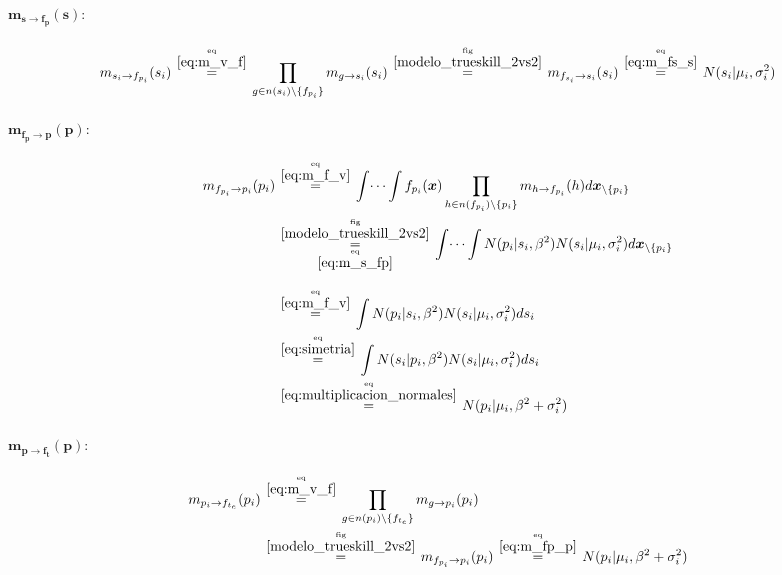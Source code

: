 \documentclass[article]{jss}
\newcommand\hfrac[2]{\genfrac{}{}{0pt}{}{#1}{#2}} %
\begin{document}
\begin{appendix}
\paragraph{$\bm{m_{s \rightarrow f_p}(s)}:$}

\begin{equation}\label{eq:m_s_fp}
 m_{s_i \rightarrow f_{p_i}}(s_i) \overset{\hfrac{\text{eq}}{\ref{eq:m_v_f}}}{=} \prod_{g \in n(s_i) \setminus  \{f_{p_i} \}} m_{g \rightarrow s_i} (s_i) \overset{\hfrac{\text{fig}}{\ref{modelo_trueskill_2vs2}}}{=} m_{f_{s_i} \rightarrow s_i}(s_i) \overset{\hfrac{\text{eq}}{\ref{eq:m_fs_s}}}{=}   N(s_i| \mu_i, \sigma_i^2)
\end{equation}



\paragraph{$\bm{m_{f_p \rightarrow p}(p)}:$}

\begin{equation}\label{eq:m_fp_p}
\begin{split}
 m_{f_{p_i} \rightarrow p_i}(p_i) & \overset{\hfrac{\text{eq}}{\ref{eq:m_f_v}}}{=} \int \dots \int f_{p_i}(\bm{x}) \prod_{h \in n(f_{p_i}) \setminus \{p_i\} } m_{h \rightarrow f_{p_i}}(h) d\bm{x}_{\setminus \{p_i\} }  \\
 & \overset{\hfrac{\text{fig}}{\ref{modelo_trueskill_2vs2}}}{\underset{\hfrac{\text{eq}}{\ref{eq:m_s_fp}}}{=}} \int \dots \int N(p_i| s_i, \beta^2) N(s_i| \mu_i, \sigma_i^2) d\bm{x}_{\setminus \{p_i\} } \\[0.3cm]
 & \overset{\hfrac{\text{eq}}{\ref{eq:m_f_v}}}{=} \int N(p_i| s_i, \beta^2) N(s_i| \mu_i, \sigma_i^2) ds_i \\
 & \overset{\hfrac{\text{eq}}{\ref{eq:simetria}}}{=} \int N(s_i|p_i, \beta^2) N(s_i| \mu_i, \sigma_i^2) ds_i \\
& \overset{\hfrac{\text{eq}}{\ref{eq:multiplicacion_normales}}}{=} N(p_i|\mu_i,\beta^2 + \sigma_i^2)
\end{split}
\end{equation}

\paragraph{$\bm{m_{p \rightarrow f_t}(p)}:$}

\begin{equation}\label{eq:m_p_ft}
\begin{split}
 m_{p_i \rightarrow f_{t_e}}(p_i) & \overset{\hfrac{\text{eq}}{\ref{eq:m_v_f}}}{=} \prod_{g \in n(p_i) \setminus  \{f_{t_e} \}} m_{g \rightarrow p_i} (p_i) \\
 & \overset{\hfrac{\text{fig}}{\ref{modelo_trueskill_2vs2}}}{=} m_{f_{p_i} \rightarrow p_i}(p_i) \overset{\hfrac{\text{eq}}{\ref{eq:m_fp_p}}}{=} N(p_i|\mu_i,\beta^2 + \sigma_i^2)
\end{split}
\end{equation}


\end{appendix}
\end{document}
